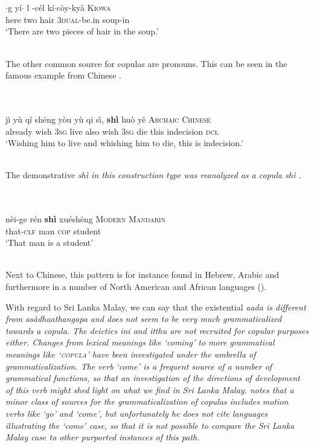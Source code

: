 \documentclass[a4paper,12pt]{article}
\newcommand{\xbox}[2]{\noindent\parbox[t]{#1}{#2}\noindent}
\newcommand{\ea}{\\\\}
\newcommand{\z}{\\\\}
\begin{document}
\xbox{\textwidth}{
\ea\label{ex:intro:kiowa:loc}
\gll \textipa{\textsubdot{\'e}}$\cdot$g\textipa{\`O}  yí$\cdot$ \textipa{\'O}l \textipa{\textpolhook{\`e}}-cél kí$\cdot$còy-kyà  \textsc{Kiowa} \\
     here two hair \textsc{3dual}-be.in soup-in   \\
    `There are two pieces of hair in the soup.' \citep[211]{Watkins1984}
\z
}



The other common source for copulas are pronouns. This can be seen in the famous example from Chinese \citep{LiEtAl1977cop}.

\xbox{15cm}{
\ea
\gll jì yù qí sh\=eng yòu yù qi s\v\i{}, \textbf{shì} huò y\v e  \textsc{Archaic Chinese}\\
     already wish \textsc{3sg} live also wish \textsc{3sg} die this indecision \textsc{dcl}  \\
    `Wishing him to live and whishing him to die, this is indecision.' \citep[424]{LiEtAl1977cop}
\z
} 

The demonstrative \em shì \em in this  construction type was reanalyzed as a copula \em shì \em \citep[424]{LiEtAl1977cop}.



\xbox{\textwidth}{
\ea
\gll nèi-ge rén   \textbf{shì} xuésh\=eng \textsc{Modern Mandarin} \\
     that-\textsc{clf} man \textsc{cop} student \\
    `That man is a student' \citep[422]{LiEtAl1977cop}
\z
} 

Next to Chinese, this pattern is for instance found in Hebrew, Arabic and furthermore in a number of North American and African languages (\citet[77--91]{Stassen1997}).

With regard to Sri Lanka Malay, we can say that the existential \em aada \em is different from \em asàdhaathangapa \em and does not seem to be very much grammaticalized towards a copula. The deictics \em ini \em and \em itthu \em are not recruited for copular purposes either.
Changes from lexical meanings like `coming' to more grammatical meanings like `\textsc{copula}' have been investigated under the umbrella of grammaticalization. The verb `come' is a frequent source of a number of grammatical functions, so that an investigation
of the directions of development of this verb might shed light on what we find in Sri Lanka Malay.  \citet[92]{Stassen1997} notes that a minor class of sources for the grammaticalization of copulas includes motion verbs like `go' and `come', but unfortunately he does not cite languages illustrating the `come' case, so that it is not possible to compare the Sri Lanka Malay case to other purported instances of this path.
\end{document}
